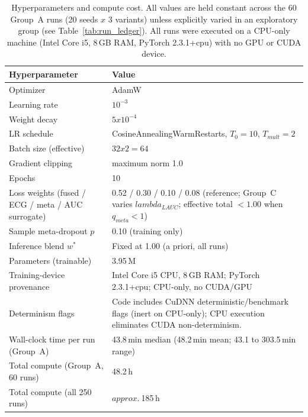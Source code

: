 \documentclass[mathematics,article,pdftex]{Definitions/mdpi}
\def\mathrm#1{#1}%
\def\textbf#1{#1}%
\def\times{x}%
\def\approx{approx.\ }%
\def\lambda{lambda }%
\begin{document}
\begin{table}[H]
\caption{Hyperparameters and compute cost. All values are held constant across the 60 Group~A runs (20 seeds $\times$ 3 variants) unless explicitly varied in an exploratory group (see Table~\ref{tab:run_ledger}). All runs were executed on a CPU-only machine (Intel Core i5, 8\,GB RAM, PyTorch 2.3.1+cpu) with no GPU or CUDA device.}
\label{tab:hparams}
\centering
\small
\begin{tabularx}{\textwidth}{@{}>{\raggedright\arraybackslash}p{}X@{}}
\toprule
\textbf{Hyperparameter} & \textbf{Value} \\
\midrule
Optimizer              & AdamW \\
Learning rate          & $10^{-3}$ \\
Weight decay           & $5\times 10^{-4}$ \\
LR schedule            & CosineAnnealingWarmRestarts, $T_0{=}10$, $T_{\mathrm{mult}}{=}2$ \\
Batch size (effective) & $32\times 2 = 64$ \\
Gradient clipping      & maximum norm 1.0 \\
Epochs                 & 10 \\
Loss weights (fused / ECG / meta / AUC surrogate) & 0.52 / 0.30 / 0.10 / 0.08 (reference; Group~C varies $\lambda_{\mathrm{LAUC}}$; effective total ${<}1.00$ when $q_{\mathrm{meta}}{<}1$) \\
Sample meta-dropout $p$ & 0.10 (training only) \\
Inference blend $w^{\ast}$ & Fixed at 1.00 (a priori, all runs) \\
Parameters (trainable) & 3.95\,M \\
Training-device provenance & Intel Core i5 CPU, 8\,GB RAM; PyTorch 2.3.1+cpu; CPU-only, no CUDA/GPU \\
Determinism flags & Code includes CuDNN deterministic/benchmark flags (inert on CPU-only); CPU execution eliminates CUDA non-determinism. \\
Wall-clock time per run (Group~A) & 43.8\,min median (48.2\,min mean; 43.1 to 303.5\,min range) \\
Total compute (Group~A, 60 runs) & 48.2\,h \\
Total compute (all 250 runs) & $\approx$185\,h \\
\bottomrule
\end{tabularx}
\end{table}
\end{document}

